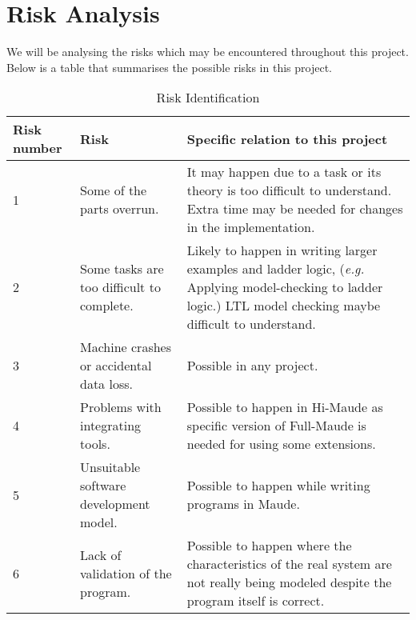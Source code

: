 \documentclass[a4paper,11pt]{report}
\begin{document}
\section{Risk Analysis}
We will be analysing the risks which may be encountered throughout this project. 
Below is a table that summarises the possible risks in this project.
\begin{table}[h]
\hspace*{-1cm}
\renewcommand\arraystretch{2.4}
\begin{tabular}{|p{2.5cm}|p{6cm}|p{6cm}|}
\hline
\textbf{Risk number} & \textbf{Risk} & \textbf{Specific relation to this project} \\ \hline
1 & Some of the parts overrun. & It may happen due to a task or its theory is too difficult to understand. Extra time may be needed for changes in the implementation.\\ \hline
2 & Some tasks are too difficult to complete. & Likely to happen in writing larger examples and ladder logic, (\textit{e.g.} Applying model-checking to ladder logic.) LTL model checking maybe difficult to understand.\\ \hline
3 & Machine crashes or accidental data loss. & Possible in any project. \\ \hline
4 & Problems with integrating tools. & Possible to happen in Hi-Maude as specific version of Full-Maude is needed for using some extensions. \\ \hline
5 & Unsuitable software development model. & Possible to happen while writing programs in Maude. \\ \hline
6 & Lack of validation of the program. & Possible to happen where the characteristics of the real system are not really being modeled despite the program itself is correct.  \\
 \hline
\end{tabular}
\caption{Risk Identification}
\label{table:ri}
\end{table}
\newpage
\end{document}

